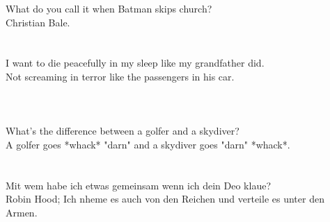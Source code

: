 
\usepackage{blindtext}



What do you call it when Batman skips church?\\
 Christian Bale.\\

\blindtext
\blindtext \\\\



I want to die peacefully in my sleep like my grandfather did.\\
 Not screaming in terror like the passengers in his car.\\\\


\blindtext
\blindtext\\\\

What's the difference between a golfer and a skydiver?\\
 A golfer goes *whack* "darn" and a skydiver goes "darn" *whack*.\\

\blindtext
\blindtext\\\\

Mit wem habe ich etwas gemeinsam wenn ich dein Deo klaue?\\
Robin Hood; Ich nheme es auch von den Reichen und verteile es unter den Armen.\\

